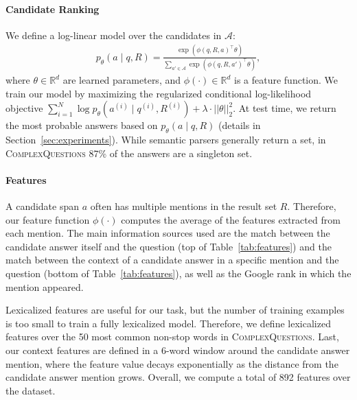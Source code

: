 \documentclass[11pt,a4paper]{article}
\begin{document}
\paragraph{Candidate Ranking}

We define a log-linear model over the candidates in $\mathcal{A}$:
\begin{align*}
p_\theta(a \mid q, R) = \frac{\exp(\phi(q, R, a)^\top \theta)}{\sum_{a' \in \mathcal{A}} \exp(\phi(q, R, a')^\top \theta)},
\end{align*}
where $\theta \in \mathbb{R}^d$ are learned parameters, and $\phi(\cdot) \in \mathbb{R}^d$ is a feature function. We train our model by maximizing the regularized conditional log-likelihood objective $\sum_{i=1}^N \log p_\theta(a^{(i)} \mid q^{(i)}, R^{(i)}) + \lambda \cdot ||\theta||_2^2$. 
At test time, we return the most probable answers based on $p_\theta(a \mid q, R)$ (details in Section~\ref{sec:experiments}). While semantic parsers generally return a set, in \textsc{ComplexQuestions} 87\% of the answers are a singleton set.

\paragraph{Features} A candidate span $a$ often has multiple mentions in the result set $R$. Therefore, our feature function $\phi(\cdot)$ computes the average of the features extracted from each mention.
The main information sources used are the match between the candidate answer itself and the question (top of Table~\ref{tab:features}) and the match between the context of a candidate answer in a specific mention and the question (bottom of Table~\ref{tab:features}), as well as the Google rank in which the mention appeared.

Lexicalized features are useful for our task, but the number of training examples is too small to train a fully lexicalized model. Therefore, we define lexicalized features over the 50 most common non-stop words in \textsc{ComplexQuestions}. Last, our context features are defined in a 6-word window around the candidate answer mention, where the feature value decays exponentially as the distance from the candidate answer mention grows.
Overall, we compute a total of 892 features over the dataset.
\end{document}
